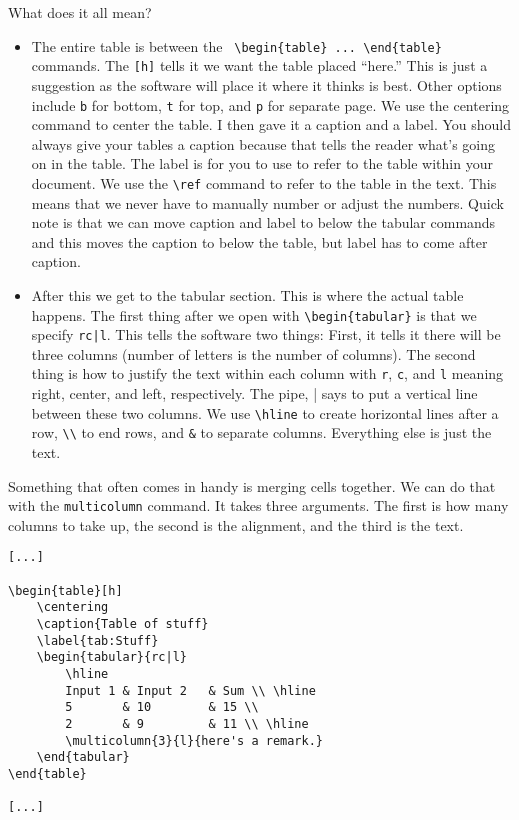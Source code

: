 \noindent What does it all mean?

\begin{itemize}
\item The entire table is between the \verb| \begin{table} ... \end{table}| commands. The \texttt{[h]} tells it we want the table placed ``here.'' This is just a suggestion as the software will place it where it thinks is best. Other options include \texttt{b} for bottom, \texttt{t} for top, and \texttt{p} for separate page. We use the centering command to center the table. I then gave it a caption and a label. You should always give your tables a caption because that tells the reader what's going on in the table. The label is for you to use to refer to the table within your document. We use the \verb|\ref| command to refer to the table in the text. This means that we never have to manually number or adjust the numbers. Quick note is that we can move caption and label to below the tabular commands and this
moves the caption to below the table, but label has to come after caption.

\item After this we get to the tabular section. This is where the actual table happens. The first thing after we open with \verb|\begin{tabular}| is that we specify \texttt{rc|l}. This tells the software two
things: First, it tells it there will be three columns (number of letters is the number of
columns). The second thing is how to justify the text within each column with \texttt{r}, \texttt{c}, and \texttt{l} meaning right, center, and left, respectively. The pipe, | says to put a vertical line between these two columns. We use \verb|\hline| to create horizontal lines after a row, \verb|\\| to end rows, and \verb|&| to separate columns. Everything else is just the text.
\end{itemize}

Something that often comes in handy is merging cells together. We can do that with the \texttt{multicolumn} command. It takes three arguments. The first is how many columns to take up, the second is the alignment, and the third is the text.

\begin{lstlisting}
[...]

\begin{table}[h]
	\centering
	\caption{Table of stuff}
	\label{tab:Stuff}
	\begin{tabular}{rc|l}
		\hline
		Input 1	& Input 2	& Sum \\ \hline
		5 		& 10 		& 15 \\
		2 		& 9 		& 11 \\ \hline
		\multicolumn{3}{l}{here's a remark.}
	\end{tabular}
\end{table}

[...]
\end{lstlisting}

